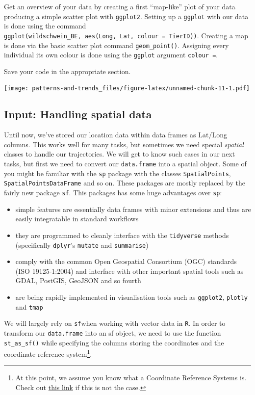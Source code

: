 \documentclass[]{book}
\providecommand{\tightlist}{%
  \setlength{\itemsep}{0pt}\setlength{\parskip}{0pt}}
\let\rmarkdownfootnote\footnote%
\def\footnote{\protect\rmarkdownfootnote}
\begin{document}
Get an overview of your data by creating a first ``map-like'' plot of your data producing a simple scatter plot with \texttt{ggplot2}.
Setting up a \texttt{ggplot} with our data is done using the command \texttt{ggplot(wildschwein\_BE,\ aes(Long,\ Lat,\ colour\ =\ TierID))}. Creating a map is done via the basic scatter plot command \texttt{geom\_point()}.
Assigning every individual its own colour is done using the \texttt{ggplot} argument \texttt{colour\ =}.

Save your code in the appropriate section.

\texttt{[image: patterns-and-trends\_files/figure-latex/unnamed-chunk-11-1.pdf]}

\hypertarget{input-handling-spatial-data}{%
\subsection{Input: Handling spatial data}\label{input-handling-spatial-data}}

Until now, we've stored our location data within data frames as Lat/Long columns. This works well for many tasks, but sometimes we need special \emph{spatial} classes to handle our trajectories. We will get to know such cases in our next tasks, but first we need to convert our \texttt{data.frame} into a spatial object.
Some of you might be familiar with the \texttt{sp} package with the classes \texttt{SpatialPoints}, \texttt{SpatialPointsDataFrame} and so on. These packages are mostly replaced by the fairly new package \texttt{sf}. This packages has some huge advantages over \texttt{sp}:

\begin{itemize}
\tightlist
\item
  simple features are essentially data frames with minor extensions and thus are easily integratable in standard workflows
\item
  they are programmed to cleanly interface with the \texttt{tidyverse} methods (specifically \texttt{dplyr}'s \texttt{mutate} and \texttt{summarise})
\item
  comply with the common Open Geospatial Consortium (OGC) standards (ISO 19125-1:2004) and interface with other important spatial tools such as GDAL, PostGIS, GeoJSON and so fourth
\item
  are being rapidly implemented in visualisation tools such as \texttt{ggplot2}, \texttt{plotly} and \texttt{tmap}
\end{itemize}

We will largely rely on \texttt{sf}when working with vector data in \texttt{R}. In order to transform our \texttt{data.frame} into an sf object, we need to use the function \texttt{st\_as\_sf()} while specifying the columns storing the coordinates and the coordinate reference system\footnote{At this point, we assume you know what a Coordinate Reference Systems is. Check out \href{https://earthdatascience.org/courses/earth-analytics/spatial-data-r/intro-to-coordinate-reference-systems/}{this link} if this is not the case.}.
\end{document}
